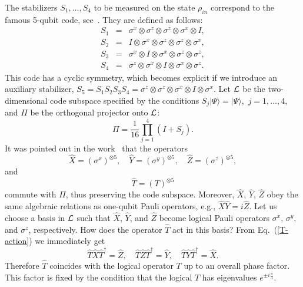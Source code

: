 \documentclass[pra,twocolumn,showpacs]{revtex4}
\newcommand{\calL}{{\cal L }}
\newcommand{\ra}{\rangle}
\newcommand{\sx}{\sigma^x}
\newcommand{\sy}{\sigma^y}
\newcommand{\sz}{\sigma^z}
\newcommand{\nn}{\nonumber}
\newcommand{\sm}{\sigma}
\begin{document}
The stabilizers $S_1,\ldots, S_4$ to be measured on the state $\rho_{in}$
correspond to the famous 5-qubit code, see~\cite{BDSW96,LMPZ96}. 
They are defined as follows:
\begin{eqnarray}
\label{5-code}
S_1&=&\sm^x\otimes\sm^z\otimes\sm^z\otimes\sm^x\otimes I, \nn \\
S_2&=&I\otimes\sm^x\otimes\sm^z\otimes\sm^z\otimes\sm^x, \nn \\
S_3&=&\sm^x\otimes I\otimes\sm^x\otimes\sm^z\otimes\sm^z, \nn \\
S_4&=&\sm^z\otimes\sm^x\otimes I\otimes\sm^x\otimes\sm^z.
\end{eqnarray}
This code has a cyclic symmetry, which becomes explicit if we introduce
an auxiliary stabilizer, $S_5=S_1 S_2 S_3 S_4=
\sm^z\otimes\sm^z\otimes\sm^x\otimes I\otimes\sm^x$.
Let $\calL$ be the two-dimensional  code subspace
specified by the conditions $S_j|\Psi\ra=|\Psi\ra$,\, $j=1,\ldots,4$,
and $\Pi$ be the orthogonal projector onto $\calL$:
\begin{equation}
\label{proj}
\Pi = \frac1{16}\prod_{j=1}^4 (I+ S_j).
\end{equation}
It was pointed out in the work~\cite{G97a} that the operators
\[
\hat{X}={(\sm^x)}^{\otimes 5}, \quad
\hat{Y}={(\sm^y)}^{\otimes 5}, \quad
\hat{Z}={(\sm^z)}^{\otimes 5},
\]
and
\begin{equation}\label{hatT}
\hat{T}={(T)}^{\otimes 5}
\end{equation}
commute with $\Pi$, thus preserving the code subspace. Moreover, $\hat{X}$,
$\hat{Y}$, $\hat{Z}$ obey the same algebraic relations as one-qubit Pauli
operators, e.g., $\hat{X}\hat{Y}=i\hat{Z}$. Let us choose a basis in $\calL$
such that $\hat{X}$, $\hat{Y}$, and $\hat{Z}$ become logical Pauli operators
$\sx$, $\sy$, and $\sz$, respectively. How does the operator $\hat{T}$ act in
this basis?  From Eq.~(\ref{T-action}) we immediately get
\[
\hat{T}\hat{X}\hat{T}^\dag = \hat{Z},\quad
\hat{T}\hat{Z}\hat{T}^\dag = \hat{Y},\quad
\hat{T}\hat{Y}\hat{T}^\dag = \hat{X}.
\]
Therefore $\hat{T}$ coincides with the logical operator $T$ up to an overall
phase factor. This factor is fixed by the condition that the logical $T$ has
eigenvalues $e^{\pm i\frac{\pi}{3}}$.
\end{document}

